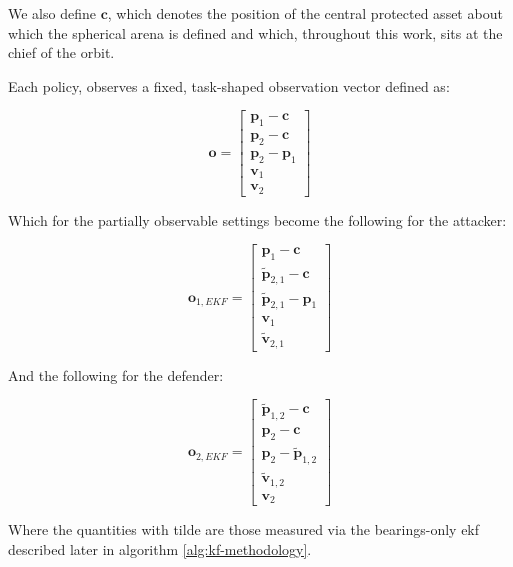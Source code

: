 We also define $\mathbf{c}$, which denotes the position of the central protected asset about which the spherical arena is defined and which, throughout this work, sits at the chief of the orbit.

Each policy, observes a fixed, task-shaped observation vector defined as:

\begin{equation}
\label{eq:Full_Obs_Both_Agents}
\boxed{
\mathbf{o} =
\begin{bmatrix}
\mathbf{p}_1-\mathbf{c}\\
\mathbf{p}_2-\mathbf{c}\\
\mathbf{p}_2-\mathbf{p}_1\\
\mathbf{v}_1\\
\mathbf{v}_2
\end{bmatrix}
}
\end{equation}



Which for the partially observable settings become the following for the attacker:

\begin{equation}
\label{eq:EKF_Obs_Agent_1}
\boxed{
\mathbf{o}_{1,EKF} =
\begin{bmatrix}
\mathbf{p}_1-\mathbf{c}\\
\tilde{\mathbf{p}}_{2,1}-\mathbf{c}\\
\tilde{\mathbf{p}}_{2,1}-\mathbf{p}_1\\
\mathbf{v}_1\\
\tilde{\mathbf{v}}_{2,1}
\end{bmatrix}
}
\end{equation}

And the following for the defender:

\begin{equation}
\label{eq:EKF_Obs_Agent_2}
\boxed{
\mathbf{o}_{2,EKF} =
\begin{bmatrix}
\tilde{\mathbf{p}}_{1,2}-\mathbf{c}\\
\mathbf{p}_2-\mathbf{c}\\
\mathbf{p}_2-\tilde{\mathbf{p}}_{1,2}\\
\tilde{\mathbf{v}}_{1,2}\\
\mathbf{v}_2
\end{bmatrix}
}
\end{equation}

Where the quantities with tilde are those measured  via the bearings-only \acs{ekf} described later in algorithm \ref{alg:kf-methodology}. 

